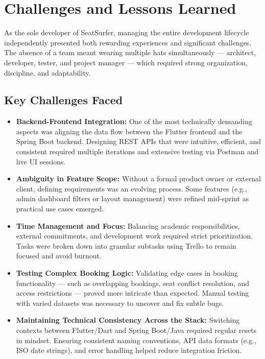 \documentclass[12pt,a4paper]{report}
\begin{document}
\section{Challenges and Lessons Learned}

As the sole developer of SeatSurfer, managing the entire development lifecycle independently presented both rewarding experiences and significant challenges. The absence of a team meant wearing multiple hats simultaneously — architect, developer, tester, and project manager — which required strong organization, discipline, and adaptability.

\subsection*{Key Challenges Faced}

\begin{itemize}
\item \textbf{Backend-Frontend Integration:}
One of the most technically demanding aspects was aligning the data flow between the Flutter frontend and the Spring Boot backend. Designing REST APIs that were intuitive, efficient, and consistent required multiple iterations and extensive testing via Postman and live UI sessions.
\item \textbf{Ambiguity in Feature Scope:}  
Without a formal product owner or external client, defining requirements was an evolving process. Some features (e.g., admin dashboard filters or layout management) were refined mid-sprint as practical use cases emerged.
\item \textbf{Time Management and Focus:}  
Balancing academic responsibilities, external commitments, and development work required strict prioritization. Tasks were broken down into granular subtasks using Trello to remain focused and avoid burnout.
\item \textbf{Testing Complex Booking Logic:}  
Validating edge cases in booking functionality — such as overlapping bookings, seat conflict resolution, and access restrictions — proved more intricate than expected. Manual testing with varied datasets was necessary to uncover and fix subtle bugs.
\item \textbf{Maintaining Technical Consistency Across the Stack:}  
Switching contexts between Flutter/Dart and Spring Boot/Java required regular resets in mindset. Ensuring consistent naming conventions, API data formats (e.g., ISO date strings), and error handling helped reduce integration friction.
\end{itemize}
\end{document}

